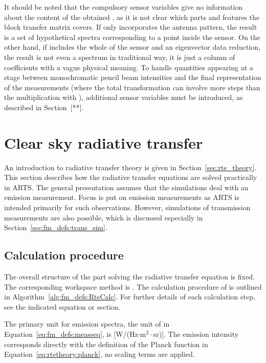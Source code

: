 It should be noted that the compulsory sensor variables give no
information about the content of the obtained \MsrVct, as it is not
clear which parts and features the block transfer matrix covers. If
 only incorporates the antenna pattern, the result is a set
of hypothetical spectra corresponding to a point inside the sensor. On
the other hand, if  includes the whole of the sensor and an
eigenvector data reduction, the result is not even a spectrum in
traditional way, it is just a column of coefficients with a vague
physical meaning. To handle quantities appearing at a stage between
monochromatic pencil beam intensities and the final representation of
the measurements (where the total transformation can involve more
steps than the multiplication with ), additional sensor
variables must be introduced, as described in
Section~[**]. %



\section{Clear sky radiative transfer}
\label{sec:fm_defs:rte}

An introduction to radiative transfer theory is given in
Section~\ref{sec:rte_theory}. This section describes how the radiative
transfer equations are solved practically in ARTS. The general
presentation assumes that the simulations deal with an emission
measurement. Focus is put on emission measurements as ARTS is intended
primarily for such observations. However, simulations of transmission
measurements are also possible, which is discussed especially in
Section~\ref{sec:fm_defs:trans_sim}.


\subsection{Calculation procedure}
\label{sec:fm_defs:calcproc}

The overall structure of the part solving the radiative transfer
equation is fixed. The corresponding workspace method is
. The calculation procedure of  is
outlined in Algorithm~\ref{alg:fm_defs:RteCalc}. For further details
of each calculation step, see the indicated equation or section.

The primary unit for emission spectra, the unit of  in
Equation~\ref{eq:fm_defs:measseq}, is [W/(Hz$\cdot$m$^2\cdot$sr)].
The emission intensity corresponds directly with the definition of the
Planck function in Equation~\ref{eq:rtetheory:planck}, no scaling
terms are applied.  


